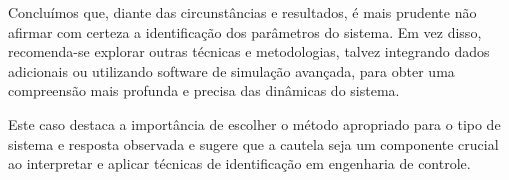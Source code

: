 Concluímos que, diante das circunstâncias e resultados, é mais prudente não afirmar com certeza a identificação dos parâmetros do sistema. Em vez disso, recomenda-se explorar outras técnicas e metodologias, talvez integrando dados adicionais ou utilizando software de simulação avançada, para obter uma compreensão mais profunda e precisa das dinâmicas do sistema.

Este caso destaca a importância de escolher o método apropriado para o tipo de sistema e resposta observada e sugere que a cautela seja um componente crucial ao interpretar e aplicar técnicas de identificação em engenharia de controle.
